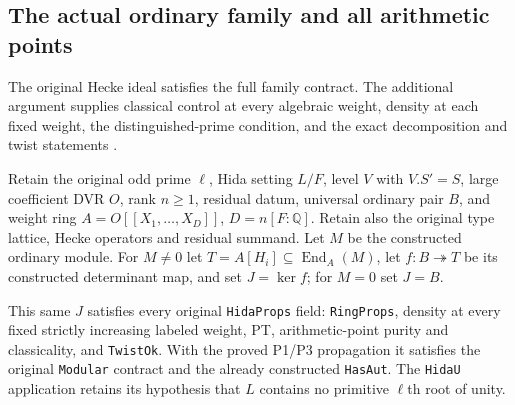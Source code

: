 \subsection{The actual ordinary family and all arithmetic points}
\label{subsec:selmer-ordinary-families}

The original Hecke ideal satisfies the full family contract.  The
additional argument supplies classical control at every algebraic
weight, density at each fixed weight, the distinguished-prime condition,
and the exact decomposition and twist statements
\cite{SelmerFamiliesSource}.

\begin{theorem}\label{thm:selmer-ordinary-families}
Retain the original odd prime $\ell$, Hida setting $L/F$, level $V$
with $V.S'=S$, large coefficient DVR $O$, rank $n\ge1$, residual
datum, universal ordinary pair $B$, and weight ring
$A=O[[X_1,\ldots,X_D]]$, $D=n[F:\mathbb Q]$.  Retain also the
original type lattice, Hecke operators and residual summand.
Let $M$ be the constructed ordinary module.  For $M\ne0$ let
$T=A[H_i]\subseteq\operatorname{End}_A(M)$, let $f:B\twoheadrightarrow T$
be its constructed determinant map, and set $J=\ker f$; for $M=0$
set $J=B$.

This same $J$ satisfies every original \texttt{HidaProps} field:
\texttt{RingProps}, density at every fixed strictly increasing labeled
weight, PT, arithmetic-point purity and classicality, and
\texttt{TwistOk}.  With the proved P1/P3 propagation it satisfies the
original \texttt{Modular} contract and the already constructed
\texttt{HasAut}.  The \texttt{HidaU} application retains its hypothesis
that $L$ contains no primitive $\ell$th root of unity.
\end{theorem}

